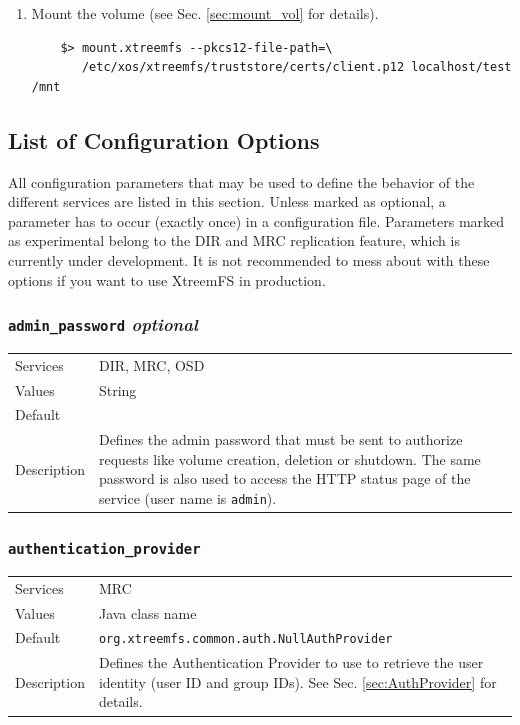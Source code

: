 \documentclass[a4paper,10pt]{book}
\begin{document}
\begin{enumerate}
 \item Mount the volume (see Sec. \ref{sec:mount_vol} for details).
	\begin{verbatim}
	$> mount.xtreemfs --pkcs12-file-path=\
	   /etc/xos/xtreemfs/truststore/certs/client.p12 localhost/test /mnt
	\end{verbatim}

\end{enumerate}


\subsection{List of Configuration Options}
\label{sec:config}

All configuration parameters that may be used to define the behavior of the different services are listed in this section. Unless marked as optional, a parameter has to occur (exactly once) in a configuration file. Parameters marked as experimental belong to the DIR and MRC replication feature, which is currently under development. It is not recommended to mess about with these options if you want to use XtreemFS in production. 


\subsubsection{\texttt{admin\_password} \textit{optional}}
\begin{tabular}{lp{10cm}}
 Services & DIR, MRC, OSD\\
 Values   & String \\
 Default  & \\
 Description & Defines the admin password that must be sent to authorize requests like volume creation, deletion or shutdown. The same password is also used to access the HTTP status page of the service (user name is \texttt{admin}).
\end{tabular}

\subsubsection{\texttt{authentication\_provider}}
\begin{tabular}{lp{10cm}}
 Services & MRC\\
 Values   & Java class name \\
 Default  & \texttt{org.xtreemfs.common.auth.NullAuthProvider}\\
 Description & Defines the Authentication Provider to use to retrieve the user identity (user ID and group IDs). See Sec. \ref{sec:AuthProvider} for details.
\end{tabular}
\end{document}
